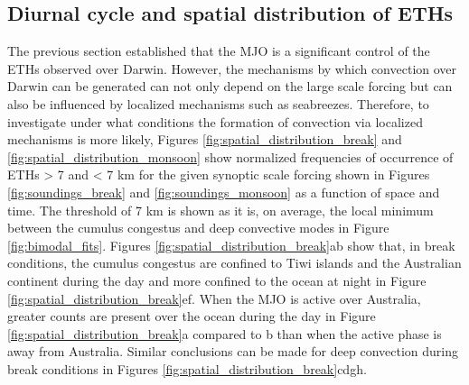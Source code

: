 \documentclass[journal abbreviation, manuscript]{copernicus}
\begin{document}
\subsection{Diurnal cycle and spatial distribution of ETHs} \label{Diurnal cycle}

    The previous section established that the MJO is a significant control of the ETHs observed over Darwin. However, the mechanisms by which convection over Darwin can be generated can not only depend on the large scale forcing but can also be influenced by localized mechanisms such as seabreezes. Therefore, to investigate under what conditions the formation of convection via localized mechanisms is more likely, Figures \ref{fig:spatial_distribution_break} and \ref{fig:spatial_distribution_monsoon} show normalized frequencies of occurrence of ETHs > 7 and < 7 km for the given synoptic scale forcing shown in Figures \ref{fig:soundings_break} and \ref{fig:soundings_monsoon} as a function of space and time. The threshold of 7 km is shown as it is, on average, the local minimum between the cumulus congestus and deep convective modes in Figure \ref{fig:bimodal_fits}. Figures \ref{fig:spatial_distribution_break}ab show that, in break conditions, the cumulus congestus are confined to Tiwi islands and the Australian continent during the day and more confined to the ocean at night in Figure \ref{fig:spatial_distribution_break}ef. When the MJO is active over Australia, greater counts are present over the ocean during the day in Figure \ref{fig:spatial_distribution_break}a compared to b than when the active phase is away from Australia. Similar conclusions can be made for deep convection during break conditions in Figures \ref{fig:spatial_distribution_break}cdgh. 
\end{document}
